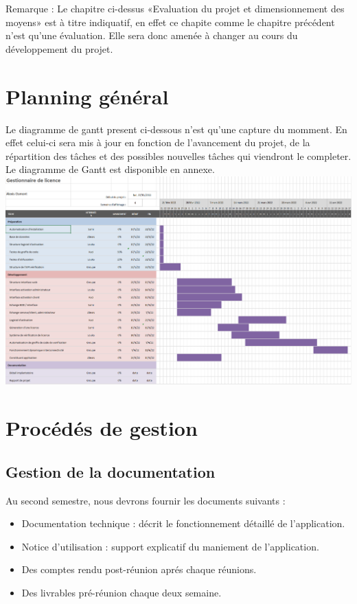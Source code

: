 	Remarque : Le chapitre ci-dessus «Evaluation du projet et dimensionnement des moyens» est à titre indiquatif, en effet ce chapite comme le chapitre précédent 
	n'est qu'une évaluation. Elle sera donc amenée à changer au cours du développement du projet.

\chapter{Planning général}
Le diagramme de gantt present ci-dessous n'est qu'une capture du momment. En effet celui-ci sera mis à jour en fonction de l'avancement
du projet, de la répartition des tâches et des possibles nouvelles tâches qui viendront le completer. \\

Le diagramme de Gantt est disponible en annexe.\\ \newline
\includegraphics[width=17cm]{Gantt.png}

\chapter{Procédés de gestion}
\section{Gestion de la documentation}
		Au second semestre, nous devrons fournir les documents suivants :
		\begin{itemize}
			\item Documentation technique : décrit le fonctionnement détaillé de l’application.
			\item Notice d’utilisation : support explicatif du maniement de l’application.
			\item Des comptes rendu post-réunion aprés chaque réunions.
			\item Des livrables pré-réunion chaque deux semaine.\\ \newline
		\end{itemize}
	
